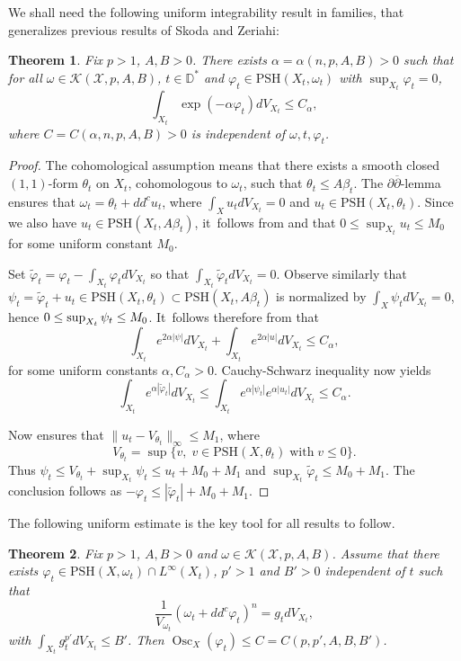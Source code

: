 \documentclass[JEP,XML,SOM,Unicode,published]{cedram}
\DeclareMathOperator{\Osc}{Osc}
\newtheorem{theorem}{Theorem}[section]
\theoremstyle{definition}
\newcommand{\D}{\mathbb D}
\let\f\varphi
\let\p\psi
\newcommand \PSH {\mathrm{PSH}}
\begin{document}
We shall need the following uniform integrability result in families, that
generalizes previous results of Skoda and Zeriahi:

\begin{theorem} \label{thm:sz}
Fix $p>1$, $A,B>0$. There exists $\alpha=\alpha(n,p,A,B)>0$ such that for all
$\omega \in {\mathcal K}(\mathcal{X},p,A,B)$, $t \in \D^*$ and
$\f_t \in \PSH(X_t,\omega_t)$ with $\sup_{X_t} \f_t=0$,
\[
\int_{X_t} \exp(-\alpha \f_t) dV_{X_t} \leq C_{\alpha},
\]
where $C=C(\alpha,n,p,A,B)>0$ is independent of $\omega,t,\f_t$.
\end{theorem}

\begin{proof}
The cohomological assumption means that there exists a smooth closed $(1,1)$-form $\theta_t$ on $X_t$,
cohomologous to $\omega_t$, such that $\theta_t \leq A\beta_t$.
The $\partial\overline{\partial}$-lemma ensures that $\omega_t=\theta_t+dd^c u_t$, where
$\int _X u_t dV_{X_t} =0$ and $u_t \in \PSH(X_t,\theta_t)$.
Since we also have $u_t \in \PSH(X_t, A \beta_t)$, it~follows from \cite[Conj.\,3.1]{DnGG23} and \cite[Cor.\,4.8]{Ou22}
that $0 \leq \sup_{X_t} u_t \leq M_0$ for some uniform constant $M_0$.

Set $\tilde{\f}_t=\f_t-\int_{X_t} \f_t dV_{X_t}$ so that $\int_{X_t} \tilde{\f}_t dV_{X_t}=0$.
Observe similarly that $ \psi_t=\tilde{\f}_t+u_t \in \PSH(X_t, \theta_t) \subset\PSH(X_t, A \beta_t)$
is normalized by $\int_{X} \psi_t dV_{X_t}=0$,
hence $0 \leq\nobreak \sup_{X_t} \psi_t \leq M_0$. It~follows therefore from \cite[Th.\,2.9]{DnGG23} that
\[
\int_{X_t} e^{2\alpha|\psi|}dV_{X_t} + \int_{X_t} e^{2\alpha| u |}dV_{X_t} \leq C_\alpha,
\]
for some uniform constants $\alpha,C_\alpha>0$.
Cauchy-Schwarz inequality now yields
\[
\int_{X_t} e^{\alpha |\tilde{\f}_t| } dV_{X_t}
\leq \int_{X_t} e^{\alpha |\psi_t| } e^{\alpha |u_t| } dV_{X_t}
\leq C_\alpha.
\]

Now \cite[Th.\,1.9]{DnGG23} ensures that $\|u_t-V_{\theta_t}\|_{\infty} \leq M_1$,
where
\[
V_{\theta_t}=\sup \{v, \; v \in\PSH(X,\theta_t) \; \text{with} \; v \leq 0 \}.
\]
Thus $\p_t \leq V_{\theta_t}+\sup_{X_t} \p_t \leq u_t+M_0+M_1$ and $\sup_{X_t} \tilde{\f}_t \leq M_0+M_1$.
The conclusion follows as $-\f_t \leq |\tilde{\f}_t|+M_0+M_1$.
\end{proof}

The following uniform estimate is the key tool for all results to follow.

\begin{theorem} \label{thm:uniformMA}
Fix $p>1$, $A,B>0$ and $\omega \in {\mathcal K}(\mathcal{X},p,A,B)$.
Assume that there exists $\f_t \in\PSH(X,\omega_t) \cap L^{\infty}(X_t)$,
$p'>1$ and $B'>0$ independent of $t$ such that
\[
\frac{1}{V_{\omega_t}}(\omega_t+dd^c \f_t)^n=g_t dV_{X_t},
\]
with $\int_{X_t} g_t^{p'} dV_{X_t} \leq B'$.
Then $\Osc_X(\f_t) \leq C=C(p,p',A,B,B')$.
\end{theorem}
\end{document}

